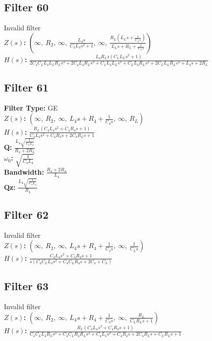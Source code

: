 \documentclass{article}
\begin{document}
\subsection*{Filter 60}
Invalid filter \\ 
\textbf{$Z(s)$:} $\left( \infty, \  R_{2}, \  \infty, \  \frac{L_{4} s}{C_{4} L_{4} s^{2} + 1}, \  \infty, \  \frac{R_{L} \left(L_{L} s + \frac{1}{C_{L} s}\right)}{L_{L} s + R_{L} + \frac{1}{C_{L} s}}\right)$ \\ 
\textbf{$H(s)$:} $\frac{L_{4} R_{L} s \left(C_{L} L_{L} s^{2} + 1\right)}{2 C_{4} C_{L} L_{4} L_{L} R_{L} s^{4} + 2 C_{4} L_{4} R_{L} s^{2} + C_{L} L_{4} L_{L} s^{3} + C_{L} L_{4} R_{L} s^{2} + 2 C_{L} L_{L} R_{L} s^{2} + L_{4} s + 2 R_{L}}$ \\ 
\subsection*{Filter 61}
\textbf{Filter Type:} GE \\ 
\textbf{$Z(s)$:} $\left( \infty, \  R_{2}, \  \infty, \  L_{4} s + R_{4} + \frac{1}{C_{4} s}, \  \infty, \  R_{L}\right)$ \\ 
\textbf{$H(s)$:} $\frac{R_{L} \left(C_{4} L_{4} s^{2} + C_{4} R_{4} s + 1\right)}{C_{4} L_{4} s^{2} + C_{4} R_{4} s + 2 C_{4} R_{L} s + 1}$ \\ 
\textbf{Q:} $\frac{L_{4} \sqrt{\frac{1}{C_{4} L_{4}}}}{R_{4} + 2 R_{L}}$ \\ 
\textbf{$\omega_0$:} $\sqrt{\frac{1}{C_{4} L_{4}}}$ \\ 
\textbf{Bandwidth:} $\frac{R_{4} + 2 R_{L}}{L_{4}}$ \\ 
\textbf{Qz:} $\frac{L_{4} \sqrt{\frac{1}{C_{4} L_{4}}}}{R_{4}}$ \\ 
\subsection*{Filter 62}
Invalid filter \\ 
\textbf{$Z(s)$:} $\left( \infty, \  R_{2}, \  \infty, \  L_{4} s + R_{4} + \frac{1}{C_{4} s}, \  \infty, \  \frac{1}{C_{L} s}\right)$ \\ 
\textbf{$H(s)$:} $\frac{C_{4} L_{4} s^{2} + C_{4} R_{4} s + 1}{s \left(C_{4} C_{L} L_{4} s^{2} + C_{4} C_{L} R_{4} s + 2 C_{4} + C_{L}\right)}$ \\ 
\subsection*{Filter 63}
Invalid filter \\ 
\textbf{$Z(s)$:} $\left( \infty, \  R_{2}, \  \infty, \  L_{4} s + R_{4} + \frac{1}{C_{4} s}, \  \infty, \  \frac{R_{L}}{C_{L} R_{L} s + 1}\right)$ \\ 
\textbf{$H(s)$:} $\frac{R_{L} \left(C_{4} L_{4} s^{2} + C_{4} R_{4} s + 1\right)}{C_{4} C_{L} L_{4} R_{L} s^{3} + C_{4} C_{L} R_{4} R_{L} s^{2} + C_{4} L_{4} s^{2} + C_{4} R_{4} s + 2 C_{4} R_{L} s + C_{L} R_{L} s + 1}$ \\ 
\end{document}
